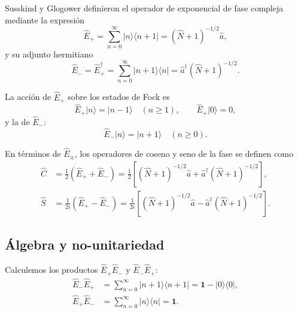             Susskind y Glogower definieron el operador de exponencial de fase compleja mediante la expresión
            \begin{equation}
                \hat{E}_{+} = \sum_{n=0}^{\infty} |n\rangle\langle n+1| = (\hat{N} + 1)^{-1/2} \hat{a},
                \label{eq:SG_Eplus}
            \end{equation}
            y su adjunto hermitiano
            \begin{equation}
                \hat{E}_{-} = \hat{E}_{+}^\dagger = \sum_{n=0}^{\infty} |n+1\rangle\langle n| = \hat{a}^{\dagger} (\hat{N} + 1)^{-1/2}.
                \label{eq:SG_Eminus}
            \end{equation}
            
            La acción de $\hat{E}_{+}$ sobre los estados de Fock es
            \begin{equation}
                \hat{E}_{+} |n\rangle = |n-1\rangle \quad (n \geq 1), \qquad \hat{E}_{+}|0\rangle = 0,
            \end{equation}
            y la de $\hat{E}_{-}$:
            \begin{equation}
                \hat{E}_{-} |n\rangle = |n+1\rangle \quad (n \geq 0).
            \end{equation}
            
            En términos de $\hat{E}_{\pm}$, los operadores de coseno y seno de la fase se definen como
            \begin{align}
                \hat{C} &= \frac{1}{2}(\hat{E}_{+} + \hat{E}_{-}) = \frac{1}{2}\left[(\hat{N}+1)^{-1/2}\hat{a} + \hat{a}^{\dagger}(\hat{N}+1)^{-1/2}\right], \\
                \hat{S} &= \frac{1}{2i}(\hat{E}_{+} - \hat{E}_{-}) = \frac{1}{2i}\left[(\hat{N}+1)^{-1/2}\hat{a} - \hat{a}^{\dagger}(\hat{N}+1)^{-1/2}\right].
                \label{eq:SG_coseno_seno}
            \end{align}
 
        \subsection{Álgebra y no-unitariedad}
        
            Calculemos los productos $\hat{E}_{+}\hat{E}_{-}$ y $\hat{E}_{-}\hat{E}_{+}$:
            \begin{align}
                \hat{E}_{-}\hat{E}_{+} &= \sum_{n=0}^{\infty}|n+1\rangle\langle n+1| = \mathbf{1} - |0\rangle\langle 0|, \\
                \hat{E}_{+}\hat{E}_{-} &= \sum_{n=0}^{\infty}|n\rangle\langle n| = \mathbf{1}.
            \end{align}
            
